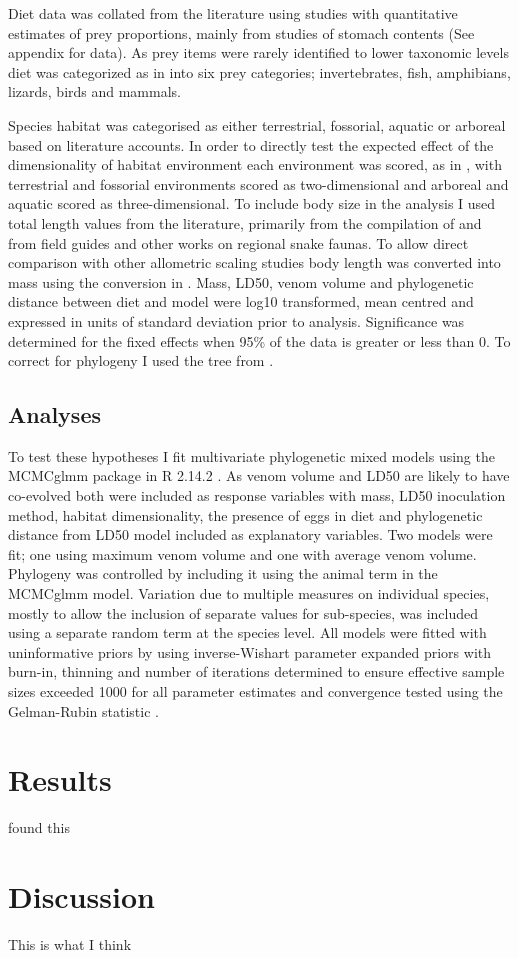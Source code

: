 Diet data was collated from the literature using studies with quantitative estimates of prey proportions, mainly from studies of stomach contents (See appendix for data). As prey items were rarely identified to lower taxonomic levels diet was categorized as in \citep{allen2013evolution} into six prey categories; invertebrates, fish, amphibians, lizards, birds and mammals.


Species habitat was categorised as either terrestrial, fossorial, aquatic or arboreal based on literature accounts.  In order to directly test the expected effect of the dimensionality of habitat environment each environment was scored, as in \citep{pawar2012dimensionality}, with terrestrial and fossorial environments scored as two-dimensional and arboreal and aquatic scored as three-dimensional.
To include body size in the analysis I used total length values from the literature, primarily from the compilation of \citep{boback2003empirical} and from field guides and other works on regional snake faunas. To allow direct comparison with other allometric scaling studies body length was converted into mass using the conversion in \citep{boback2003empirical}. 
Mass, LD50, venom volume and phylogenetic distance between diet and model were log10 transformed, mean centred and expressed in units of standard deviation prior to analysis. Significance was determined for the fixed effects when 95\% of the data is greater or less than 0. To correct for phylogeny I used the tree from \citep{pyron2014early}. 


\subsection{Analyses}

To test these hypotheses I fit multivariate phylogenetic mixed models using the MCMCglmm package \citep{hadfield2010mcmc} in R 2.14.2 \citep{RCran}.  As venom volume and LD50 are likely to have co-evolved both were included as response variables with mass, LD50 inoculation method, habitat dimensionality, the presence of eggs in diet and phylogenetic distance from LD50 model included as explanatory variables.  Two models were fit; one using maximum venom volume and one with average venom volume. Phylogeny was controlled by including it using the animal term in the MCMCglmm model. Variation due to multiple measures on individual species, mostly to allow the inclusion of separate values for sub-species, was included using a separate random term at the species level. All models were fitted with uninformative priors by using inverse-Wishart parameter expanded priors \citep{hadfield2010mcmc} with burn-in, thinning and number of iterations determined to ensure effective sample sizes exceeded 1000 for all parameter estimates and convergence tested using the Gelman-Rubin statistic \citep{gelman1992inference}. 

\section{Results}


found this

\section{Discussion}

This is what I think





